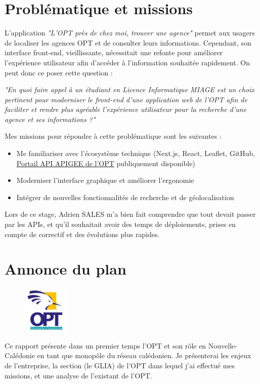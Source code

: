 \documentclass[12pt,a4paper]{report}
\begin{document}
\section{Problématique et missions}
L’application \textit{"L'OPT près de chez moi, trouver une agence"} permet aux usagers de localiser les agences OPT et de consulter leurs informations. Cependant, son interface front-end, vieillissante, nécessitait une refonte pour améliorer l’expérience utilisateur afin d'accéder à l'information souhaitée rapidement. On peut donc ce poser cette question :

\vspace{1cm}

\textit{"En quoi faire appel à un étudiant en Licence Informatique MIAGE est un choix pertinent pour moderniser le front-end d'une application web de l'OPT afin de faciliter et rendre plus agréable l'expérience utilisateur pour la recherche d'une agence et ses informations ?"}

\vspace{1cm}
Mes missions pour répondre à cette problématique sont les suivantes :  
\begin{itemize}
    \item Me familiariser avec l’écosystème technique (Next.js, React, Leaflet, GitHub, \href{https://apigee-optnc-prd-api.apigee.io}{Portail API APIGEE de l'OPT} publiquement disponible)
    \item Moderniser l’interface graphique et améliorer l’ergonomie
    \item Intégrer de nouvelles fonctionnalités de recherche et de géolocalisation
\end{itemize}
\vspace{1cm}
Lors de ce stage, Adrien SALES m'a bien fait comprendre que tout devait passer par les APIs, et qu'il souhaitait avoir des temps de déploiements, prises en compte de correctif et des évolutions plus rapides.
\newpage

\section{Annonce du plan}
\begin{figure}[h] %
    \centering
    \includegraphics[width=0.2\textwidth]{ressources_rapport/logo_opt.jpg}
\end{figure}
Ce rapport présente dans un premier temps l’OPT et son rôle en Nouvelle-Calédonie en tant que monopôle du réseau calédonien. Je présenterai les enjeux de l'entreprise, la section (le GLIA) de l'OPT dans lequel j'ai effectué mes missions, et une analyse de l'existant de l'OPT.
\end{document}
